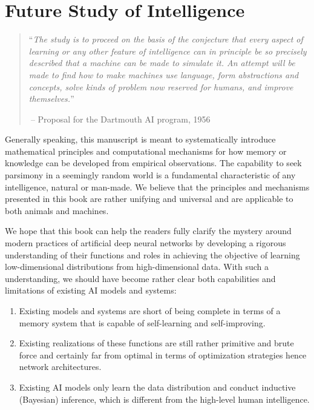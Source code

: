 \documentclass[../../book-main.tex]{subfiles}
\begin{document}
\chapter{Future Study of Intelligence}
\label{ch:future}


  

\begin{quote}
``{\em The study is to proceed on the basis of the conjecture that every aspect of learning or any other feature of intelligence can in principle be so precisely described that a machine can be made to simulate it. An attempt will be made to find how to make machines use language, form abstractions and concepts, solve kinds of problem now reserved for humans, and improve themselves.}''

$~$\hfill -- Proposal for the Dartmouth AI program, 1956
 \end{quote}
\vspace{5mm}


Generally speaking, this manuscript is meant to systematically introduce mathematical principles and computational mechanisms for how memory or knowledge can be developed from empirical observations. The capability to seek parsimony in a seemingly random world is a fundamental characteristic of any intelligence, natural or man-made. We believe that the principles and mechanisms presented in this book are rather unifying and universal and are applicable to both animals and machines. 

We hope that this book can help the readers fully clarify the mystery around modern practices of artificial deep neural networks by developing a rigorous understanding of their functions and roles in achieving the objective of learning low-dimensional distributions from high-dimensional data. With such a understanding, we should have become rather clear both capabilities and limitations of existing AI models and systems: 
\begin{enumerate}
    \item Existing models and systems are short of being complete in terms of a memory system that is capable of self-learning and self-improving.
    \item Existing realizations of these functions are still rather primitive and brute force and certainly far from optimal in terms of optimization strategies hence network architectures. 
    \item Existing AI models only learn the data distribution and conduct inductive (Bayesian) inference, which is different from the high-level human intelligence.
\end{enumerate} 
\end{document}

